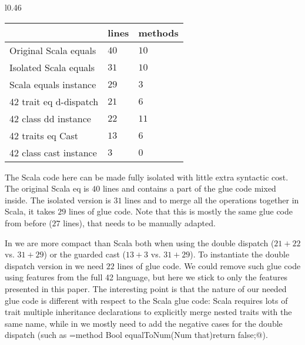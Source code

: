 \begin{wraptable}{l}{0.46\textwidth}
\begin{tabular}{@{} l l l @{}}
\toprule
&                              lines  &   methods\\
\midrule
Original Scala equals       &    $40$   &   $10$\\
Isolated Scala equals       &   $31$    &   $10$\\
Scala equals instance       &    $29$   &    $3$\\
42 trait eq d-dispatch      &   $21$
   &    $6$\\
42 class dd instance        &    $22$   &   $11$\\
42 traits eq Cast            &   $13$
   &    $6$\\
42 class cast instance      &     $3$   &    $0$\\
\bottomrule
\end{tabular}
\end{wraptable}
The Scala code here can be made fully isolated with little
extra syntactic cost. The original Scala eq is $40$ lines and
contains a part of the glue code mixed inside.
The isolated version is $31$ lines and to merge all the operations together in Scala, it
takes $29$ lines of glue code. Note that this
is mostly the same glue code from before ($27$ lines), that
needs to be manually adapted.

In \name we are
more compact than Scala both when using the double dispatch ($21+22$ vs. $31+29$)
or the guarded cast ($13+3$ vs. $31+29$).
To instantiate the double dispatch 
version in \name we need $22$ lines of glue code.
We could remove such glue code using 
features from the full 42 language, but here we stick to only the features presented in this paper.
The interesting point is that the nature of our needed glue code 
is different with respect to the Scala glue code:
Scala requires lots of trait multiple inheritance declarations to explicitly merge
nested traits with the same name, while in \name we mostly need 
to add the negative cases for the double dispatch (such as
\Q@Sum={method Bool equalToNum(Num that){return false;}}@).



